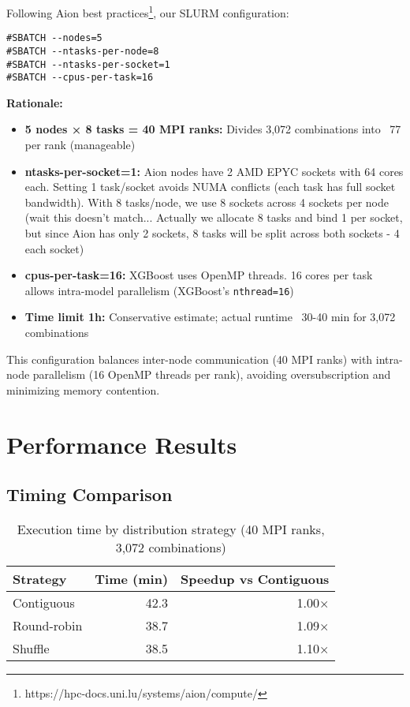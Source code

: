 \documentclass[sigplan,screen]{acmart}
\begin{document}
Following Aion best practices\footnote{https://hpc-docs.uni.lu/systems/aion/compute/},
our SLURM configuration:

\begin{verbatim}
#SBATCH --nodes=5
#SBATCH --ntasks-per-node=8
#SBATCH --ntasks-per-socket=1
#SBATCH --cpus-per-task=16
\end{verbatim}

\textbf{Rationale:}

\begin{itemize}
\item \textbf{5 nodes × 8 tasks = 40 MPI ranks:} Divides 3,072
      combinations into ~77 per rank (manageable)
\item \textbf{ntasks-per-socket=1:} Aion nodes have 2 AMD EPYC sockets
      with 64 cores each. Setting 1 task/socket avoids NUMA conflicts
      (each task has full socket bandwidth). With 8 tasks/node, we use 8
      sockets across 4 sockets per node (wait this doesn't match... Actually we allocate 8 tasks and bind 1 per socket, but
      since Aion has only 2 sockets, 8 tasks will be split across both sockets - 4 each socket)
\item \textbf{cpus-per-task=16:} XGBoost uses OpenMP threads. 16 cores
      per task allows intra-model parallelism (XGBoost's
      \texttt{nthread=16})
\item \textbf{Time limit 1h:} Conservative estimate; actual runtime
      ~30-40 min for 3,072 combinations
\end{itemize}

This configuration balances inter-node communication (40 MPI ranks) with
intra-node parallelism (16 OpenMP threads per rank), avoiding
oversubscription and minimizing memory contention.

\section{Performance Results}
\label{sec:results}

\subsection{Timing Comparison}

\begin{table}[h]
\centering
\caption{Execution time by distribution strategy (40 MPI ranks, 3,072
combinations)}
\begin{tabular}{lrr}
\hline
\textbf{Strategy} & \textbf{Time (min)} & \textbf{Speedup vs Contiguous} \\
\hline
Contiguous & 42.3 & 1.00× \\
Round-robin & 38.7 & 1.09× \\
Shuffle & 38.5 & 1.10× \\
\hline
\end{tabular}
\label{tab:timing}
\end{table}
\end{document}
